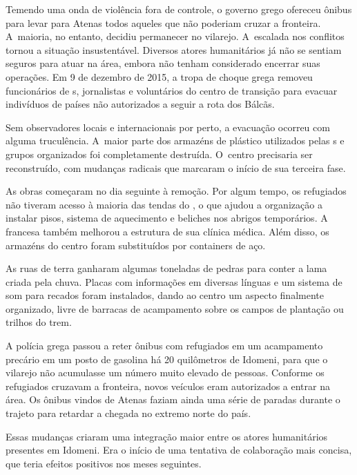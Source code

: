Temendo uma onda de violência fora de controle, o governo grego ofereceu
ônibus para levar para Atenas todos aqueles que não poderiam cruzar a
fronteira. A~maioria, no entanto, decidiu permanecer no vilarejo. A~escalada nos conflitos tornou a situação insustentável. Diversos atores
humanitários já não se sentiam seguros para atuar na área, embora não
tenham considerado encerrar suas operações. Em 9 de dezembro de 2015, a
tropa de choque grega removeu funcionários de s, jornalistas e
voluntários do centro de transição para evacuar indivíduos de países não
autorizados a seguir a rota dos Bálcãs.

Sem observadores locais e internacionais por perto, a evacuação ocorreu
com alguma truculência. A~maior parte dos armazéns de plástico
utilizados pelas s e grupos organizados foi completamente destruída.
O~centro precisaria ser reconstruído, com mudanças radicais que marcaram
o início de sua terceira fase.

As obras começaram no dia seguinte à remoção. Por algum tempo, os
refugiados não tiveram acesso à maioria das tendas do , o que
ajudou a organização a instalar pisos, sistema de aquecimento e beliches nos
abrigos temporários. A~ francesa também melhorou a estrutura de sua
clínica médica. Além disso, os armazéns do centro foram substituídos por
containers de aço.


As ruas de terra ganharam algumas toneladas de pedras para conter a lama
criada pela chuva. Placas com informações em diversas línguas e um
sistema de som para recados foram instalados, dando ao centro um aspecto
finalmente organizado, livre de barracas de acampamento sobre os campos de
plantação ou trilhos do trem.

A polícia grega passou a reter ônibus com refugiados em um acampamento
precário em um posto de gasolina há 20 quilômetros de Idomeni, para que
o vilarejo não acumulasse um número muito elevado de pessoas. Conforme
os refugiados cruzavam a fronteira, novos veículos eram autorizados a
entrar na área. Os ônibus vindos de Atenas faziam ainda uma série de
paradas durante o trajeto para retardar a chegada no extremo norte do
país.

Essas mudanças criaram uma integração maior entre os atores humanitários
presentes em Idomeni. Era o início de uma tentativa de colaboração mais
concisa, que teria efeitos positivos nos meses seguintes.

